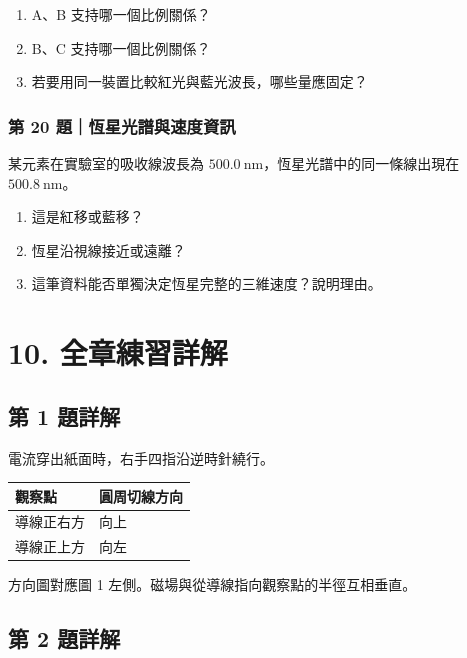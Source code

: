\documentclass[11pt,a4paper]{article}
\newcounter{none}
\providecommand{\tightlist}{%
  \setlength{\itemsep}{0pt}\setlength{\parskip}{0pt}}
\begin{document}
\begin{enumerate}
\def\labelenumi{\arabic{enumi}.}
\tightlist
\item
  A、B 支持哪一個比例關係？
\item
  B、C 支持哪一個比例關係？
\item
  若要用同一裝置比較紅光與藍光波長，哪些量應固定？
\end{enumerate}

\subsubsection{第 20 題｜恆星光譜與速度資訊}\label{ux7b2c-20-ux984cux6046ux661fux5149ux8b5cux8207ux901fux5ea6ux8cc7ux8a0a}

某元素在實驗室的吸收線波長為 \(500.0\ \mathrm{nm}\)，恆星光譜中的同一條線出現在 \(500.8\ \mathrm{nm}\)。

\begin{enumerate}
\def\labelenumi{\arabic{enumi}.}
\tightlist
\item
  這是紅移或藍移？
\item
  恆星沿視線接近或遠離？
\item
  這筆資料能否單獨決定恆星完整的三維速度？說明理由。
\end{enumerate}

\section{10. 全章練習詳解}\label{ux5168ux7ae0ux7df4ux7fd2ux8a73ux89e3}

\subsection{第 1 題詳解}\label{ux7b2c-1-ux984cux8a73ux89e3}

電流穿出紙面時，右手四指沿逆時針繞行。

{\def\LTcaptype{none} %
\begin{longtable}[]{@{}ll@{}}
\toprule\noalign{}
觀察點 & 圓周切線方向 \\
\midrule\noalign{}
\endhead
\bottomrule\noalign{}
\endlastfoot
導線正右方 & 向上 \\
導線正上方 & 向左 \\
\end{longtable}
}

方向圖對應圖 1 左側。磁場與從導線指向觀察點的半徑互相垂直。

\subsection{第 2 題詳解}\label{ux7b2c-2-ux984cux8a73ux89e3}
\end{document}

